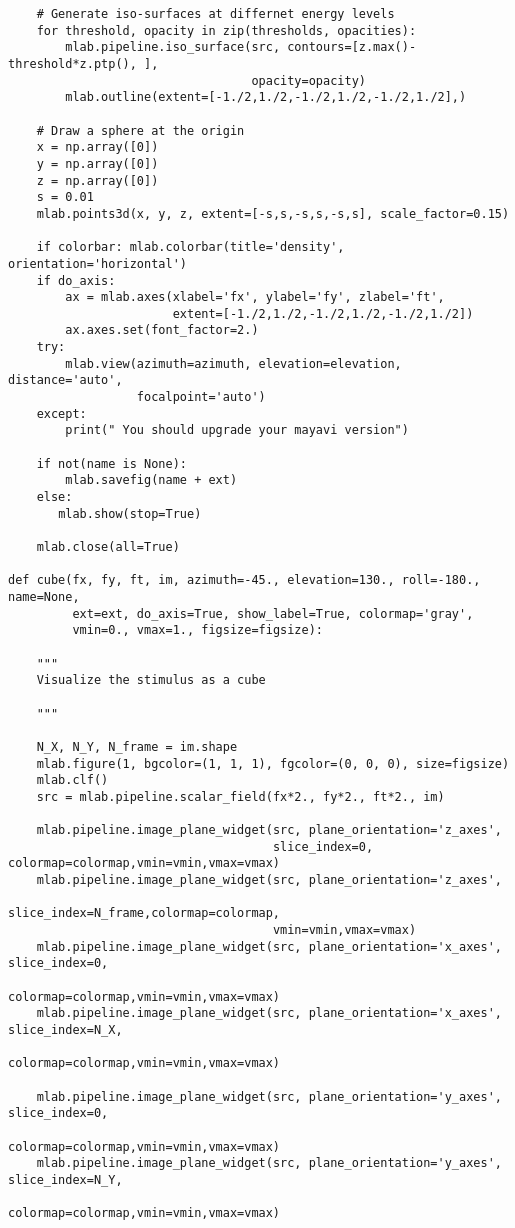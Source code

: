\documentclass[a4paper,11pt]{article}%
\begin{document}
\begin{lstlisting}
    # Generate iso-surfaces at differnet energy levels
    for threshold, opacity in zip(thresholds, opacities):
        mlab.pipeline.iso_surface(src, contours=[z.max()-threshold*z.ptp(), ],
                                  opacity=opacity)
        mlab.outline(extent=[-1./2,1./2,-1./2,1./2,-1./2,1./2],)
    
    # Draw a sphere at the origin
    x = np.array([0])
    y = np.array([0])
    z = np.array([0])
    s = 0.01
    mlab.points3d(x, y, z, extent=[-s,s,-s,s,-s,s], scale_factor=0.15)

    if colorbar: mlab.colorbar(title='density', orientation='horizontal')
    if do_axis:
        ax = mlab.axes(xlabel='fx', ylabel='fy', zlabel='ft',
                       extent=[-1./2,1./2,-1./2,1./2,-1./2,1./2])
        ax.axes.set(font_factor=2.)
    try:
        mlab.view(azimuth=azimuth, elevation=elevation, distance='auto',
                  focalpoint='auto')
    except:
        print(" You should upgrade your mayavi version")

    if not(name is None):
        mlab.savefig(name + ext)
    else:
       mlab.show(stop=True)

    mlab.close(all=True)

def cube(fx, fy, ft, im, azimuth=-45., elevation=130., roll=-180., name=None,
         ext=ext, do_axis=True, show_label=True, colormap='gray',
         vmin=0., vmax=1., figsize=figsize):

    """
    Visualize the stimulus as a cube
    
    """

    N_X, N_Y, N_frame = im.shape
    mlab.figure(1, bgcolor=(1, 1, 1), fgcolor=(0, 0, 0), size=figsize)
    mlab.clf()
    src = mlab.pipeline.scalar_field(fx*2., fy*2., ft*2., im)

    mlab.pipeline.image_plane_widget(src, plane_orientation='z_axes', 
                                     slice_index=0, colormap=colormap,vmin=vmin,vmax=vmax)
    mlab.pipeline.image_plane_widget(src, plane_orientation='z_axes',
                                     slice_index=N_frame,colormap=colormap,
                                     vmin=vmin,vmax=vmax)
    mlab.pipeline.image_plane_widget(src, plane_orientation='x_axes', slice_index=0,
                                     colormap=colormap,vmin=vmin,vmax=vmax)
    mlab.pipeline.image_plane_widget(src, plane_orientation='x_axes', slice_index=N_X,
                                     colormap=colormap,vmin=vmin,vmax=vmax)

    mlab.pipeline.image_plane_widget(src, plane_orientation='y_axes', slice_index=0,
                                     colormap=colormap,vmin=vmin,vmax=vmax)
    mlab.pipeline.image_plane_widget(src, plane_orientation='y_axes', slice_index=N_Y,
                                     colormap=colormap,vmin=vmin,vmax=vmax)


\end{lstlisting}
\end{document}

